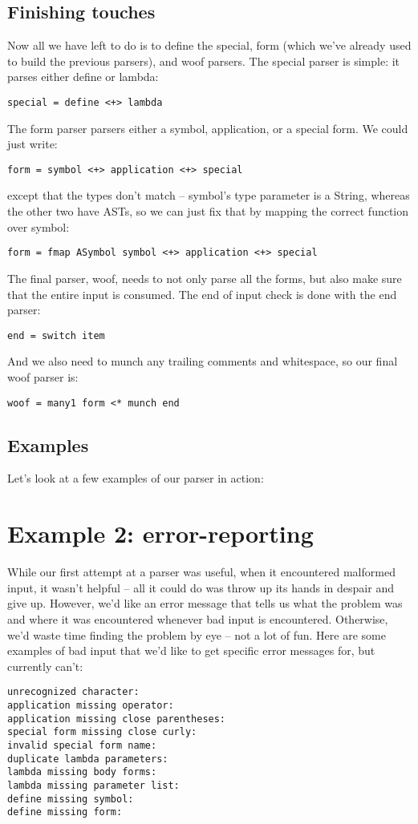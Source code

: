\documentclass{tmr}
\begin{document}
\subsection{Finishing touches}
Now all we have left to do is to define the special, form (which we've already used to build
the previous parsers), and woof parsers.  The special parser is simple:  it parses either 
define or lambda:
\begin{verbatim}
special = define <+> lambda
\end{verbatim}
The form parser parsers either a symbol, application, or a special form.  We could just write:
\begin{verbatim}
form = symbol <+> application <+> special
\end{verbatim}
except that the types don't match -- symbol's type parameter is a String, whereas the other two
have ASTs, so we can just fix that by mapping the correct function over symbol:
\begin{verbatim}
form = fmap ASymbol symbol <+> application <+> special
\end{verbatim}
The final parser, woof, needs to not only parse all the forms, but also make sure that the
entire input is consumed.  The end of input check is done with the end parser:
\begin{verbatim}
end = switch item
\end{verbatim}
And we also need to munch any trailing comments and whitespace, so our final woof parser is:
\begin{verbatim}
woof = many1 form <* munch end
\end{verbatim}

\subsection{Examples}
Let's look at a few examples of our parser in action:




\section{Example 2: error-reporting}
While our first attempt at a parser was useful, when it encountered malformed input, it wasn't
helpful -- all it could do was throw up its hands in despair and give up.  However, we'd like
an error message that tells us what the problem was and where it was encountered whenever bad
input is encountered.  Otherwise, we'd waste time finding the problem by eye -- not a lot of 
fun.  Here are some examples of bad input that we'd like to get specific error messages for,
but currently can't:
\begin{verbatim}
unrecognized character:
application missing operator:
application missing close parentheses:
special form missing close curly:
invalid special form name:
duplicate lambda parameters:
lambda missing body forms:
lambda missing parameter list:
define missing symbol:
define missing form:
\end{verbatim}
\end{document}
